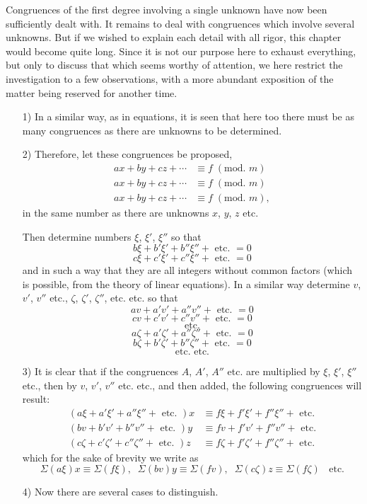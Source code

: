 \documentclass{book}
\theoremstyle{plain}
\theoremstyle{remark}
\begin{document}
Congruences of the first degree involving a single unknown have now been sufficiently dealt with.   It remains to deal with congruences which involve several unknowns.   But if we wished to explain each detail with all rigor, this chapter would become quite long.  Since it is not our purpose here to exhaust everything, but only to discuss that which seems worthy of attention, we here restrict the investigation to a few observations, with a more abundant exposition of the matter being reserved for another time.
\begin{itemize}
\item[1)] In a similar way, as in equations, it is seen that here too there must be as many congruences as there are unknowns to be determined.
\item[2)] Therefore, let these congruences be proposed,
\begin{align} ax + by + cz + \cdots &\equiv f \; (\textrm{mod. }m)  \tag{A} \\
ax + by + cz + \cdots &\equiv f \; (\textrm{mod. }m) \tag{A'} \\
ax + by + cz + \cdots &\equiv f \; (\textrm{mod. }m), \tag{A''} \end{align}
in the same number as there are unknowns $x$, $y$, $z$ etc.

Then determine numbers $\xi$, $\xi'$, $\xi''$ so that 
\[ b \xi + b' \xi' + b'' \xi'' + \textrm{ etc. } = 0 \]
\[ c \xi + c' \xi' + c'' \xi'' + \textrm{ etc. } = 0 \] 
and in such a way that they are all integers without common factors (which is possible, from the theory of linear equations).  In a similar way determine $v$, $v'$, $v''$ etc., $\zeta$, $\zeta'$, $\zeta''$, etc. etc. so that
\[ a v + a' v' + a'' v'' + \textrm{ etc. } = 0 \]
\[ c v + c' v' + c'' v'' + \textrm{ etc. } = 0 \] 
\[ \textrm{ etc. }\]
\[ a \zeta + a' \zeta' + a'' \zeta'' + \textrm{ etc. } = 0 \]
\[ b \zeta + b' \zeta' + b'' \zeta'' + \textrm{ etc. } = 0 \] 
\[ \textrm{ etc. etc. }\]
\item[3)] It is clear that if the congruences $A$, $A'$, $A''$ etc. are multiplied by $\xi$, $\xi'$, $\xi''$ etc., then by $v$, $v'$, $v''$ etc. etc., and then added, the following congruences will result:
\begin{align} (a\xi + a'\xi' + a'' \xi'' + \textrm{ etc. }) x &\equiv f \xi + f'\xi' + f''\xi'' + \textrm{ etc.} \\
(bv + b'v' + b'' v'' + \textrm{ etc. }) y &\equiv f v + f'v' + f''v'' + \textrm{ etc.} \\
(c\zeta + c'\zeta' + c'' \zeta'' + \textrm{ etc. }) z &\equiv f \zeta + f'\zeta' + f''\zeta'' + \textrm{ etc.} \end{align}
which for the sake of brevity we write as 
\[ \Sigma(a\xi)x \equiv \Sigma(f\xi), \;\; \Sigma(bv)y \equiv \Sigma(fv), \; \; \Sigma(c\zeta)z \equiv \Sigma(f\zeta)  \; \; \textrm{ etc.} \]
\item[4)] Now there are several cases to distinguish. 


\end{itemize}
\end{document}
